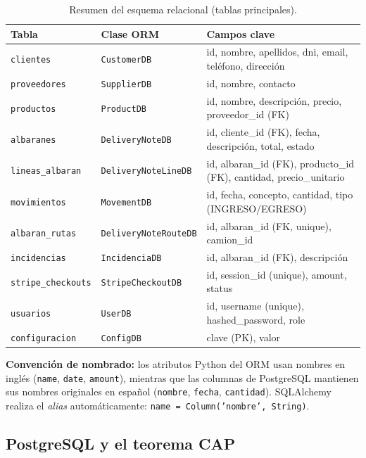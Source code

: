 \documentclass[12pt,twoside,titlepage]{report}
\begin{document}
\begin{table}[H]
  \centering
  \caption{Resumen del esquema relacional (tablas principales).}
  \label{tab:schema_resumen}
  \begin{tabular}{llp{6cm}}
    \toprule
    \textbf{Tabla} & \textbf{Clase ORM} & \textbf{Campos clave} \\
    \midrule
    \texttt{clientes}        & \texttt{CustomerDB}         & id, nombre, apellidos, dni, email, teléfono, dirección \\
    \texttt{proveedores}     & \texttt{SupplierDB}         & id, nombre, contacto \\
    \texttt{productos}       & \texttt{ProductDB}          & id, nombre, descripción, precio, proveedor\_id (FK) \\
    \texttt{albaranes}       & \texttt{DeliveryNoteDB}     & id, cliente\_id (FK), fecha, descripción, total, estado \\
    \texttt{lineas\_albaran} & \texttt{DeliveryNoteLineDB} & id, albaran\_id (FK), producto\_id (FK), cantidad, precio\_unitario \\
    \texttt{movimientos}     & \texttt{MovementDB}         & id, fecha, concepto, cantidad, tipo (INGRESO/EGRESO) \\
    \texttt{albaran\_rutas}  & \texttt{DeliveryNoteRouteDB}& id, albaran\_id (FK, unique), camion\_id \\
    \texttt{incidencias}     & \texttt{IncidenciaDB}       & id, albaran\_id (FK), descripción \\
    \texttt{stripe\_checkouts}&\texttt{StripeCheckoutDB}   & id, session\_id (unique), amount, status \\
    \texttt{usuarios}        & \texttt{UserDB}             & id, username (unique), hashed\_password, role \\
    \texttt{configuracion}   & \texttt{ConfigDB}           & clave (PK), valor \\
    \bottomrule
  \end{tabular}
\end{table}

\textbf{Convención de nombrado:} los atributos Python del ORM usan nombres en inglés (\texttt{name}, \texttt{date}, \texttt{amount}), mientras que las columnas de PostgreSQL mantienen sus nombres originales en español (\texttt{nombre}, \texttt{fecha}, \texttt{cantidad}). SQLAlchemy realiza el \emph{alias} automáticamente: \texttt{name = Column('nombre', String)}.

\subsection{PostgreSQL y el teorema CAP}
\end{document}

